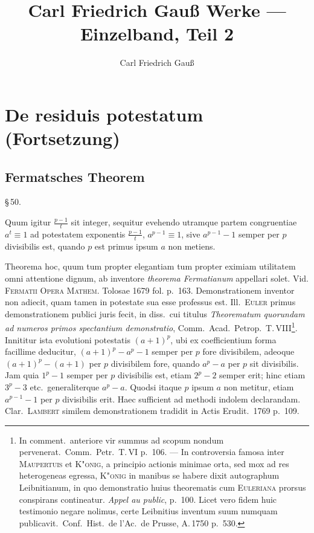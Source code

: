\documentclass[12pt,a4paper]{article}
\title{Carl Friedrich Gau\ss{} Werke --- Einzelband, Teil 2}
\author{Carl Friedrich Gau\ss}
\date{}
\theoremstyle{plain}
\theoremstyle{definition}
\theoremstyle{remark}
\begin{document}
\maketitle

\section*{De residuis potestatum (Fortsetzung)}

\subsection*{Fermatsches Theorem}

\begin{center}\S\,50.\end{center}

Quum igitur $\frac{p-1}{t}$ sit integer, sequitur evehendo utramque partem congruentiae $a^t \equiv 1$ ad potestatem exponentis $\frac{p-1}{t}$, $a^{p-1} \equiv 1$, sive $a^{p-1} - 1$ semper per $p$ divisibilis est, quando $p$ est primus ipsum $a$ non metiens.

Theorema hoc, quum tum propter elegantiam tum propter eximiam utilitatem omni attentione dignum, ab inventore \emph{theorema Fermatianum} appellari solet. Vid. \textsc{Fermatii Opera Mathem.} Tolosae 1679 fol. p.~163. Demonstrationem inventor non adiecit, quam tamen in potestate sua esse professus est. Ill.\ \textsc{Euler} primus demonstrationem publici juris fecit, in diss.\ cui titulus \emph{Theorematum quorundam ad numeros primos spectantium demonstratio}, Comm.\ Acad.\ Petrop.\ T.\,VIII\footnote{In comment.\ anteriore vir summus ad scopum nondum pervenerat.\ Comm.\ Petr.\ T.\,VI p.~106. --- In controversia famosa inter \textsc{Maupertuis} et \textsc{K"onig}, a principio actionis minimae orta, sed mox ad res heterogeneas egressa, \textsc{K"onig} in manibus se habere dixit autographum Leibnitianum, in quo demonstratio huius theorematis cum \textsc{Euleriana} prorsus conspirans contineatur. \emph{Appel au public}, p.~100. Licet vero fidem huic testimonio negare nolimus, certe Leibnitius inventum suum numquam publicavit.\ Conf.\ Hist.\ de l'Ac.\ de Prusse, A.\,1750 p.~530.}. Innititur ista evolutioni potestatis $(a+1)^p$, ubi ex coefficientium forma facillime deducitur, $(a+1)^p - a^p - 1$ semper per $p$ fore divisibilem, adeoque $(a+1)^p - (a+1)$ per $p$ divisibilem fore, quando $a^p - a$ per $p$ sit divisibilis. Jam quia $1^p - 1$ semper per $p$ divisibilis est, etiam $2^p - 2$ semper erit; hinc etiam $3^p - 3$ etc.\ generaliterque $a^p - a$. Quodsi itaque $p$ ipsum $a$ non metitur, etiam $a^{p-1} - 1$ per $p$ divisibilis erit. Haec sufficient ad methodi indolem declarandam. Clar.\ \textsc{Lambert} similem demonstrationem tradidit in Actis Erudit.\ 1769 p.~109.
\end{document}

